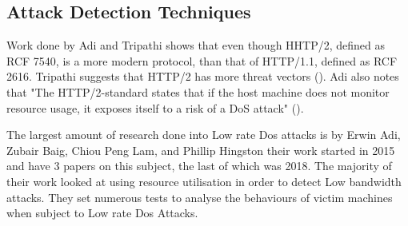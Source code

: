 \subsection{Attack Detection Techniques}

Work done by Adi and Tripathi shows that even though HHTP/2, defined as RCF 7540, is a more  modern protocol, than that of HTTP/1.1, defined as  RCF 2616. Tripathi suggests that HTTP/2 has more threat vectors (\cite{tripathi2018slow}). Adi also notes that "The HTTP/2-standard states that if the host machine does not monitor resource usage, it exposes itself to a risk of a DoS attack" (\cite{Adi2015}).

The largest amount of research done into Low rate Dos attacks is by Erwin Adi, Zubair Baig, Chiou Peng Lam, and Phillip Hingston their work started in 2015 and have 3 papers on this subject, the last of which was 2018. The majority of their work looked at using resource utilisation in order to detect Low bandwidth attacks. They set numerous tests to analyse the behaviours of victim machines when subject to Low rate Dos Attacks. 

